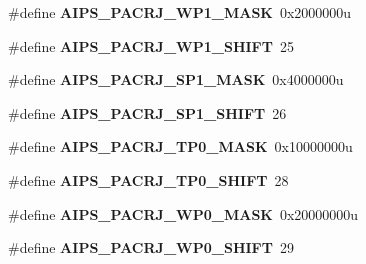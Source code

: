 \begin{DoxyCompactItemize}
\item 
\hypertarget{group___a_i_p_s___register___masks_ga1f954299ed96c89625f8767365dcdbdd}{}\#define {\bfseries A\+I\+P\+S\+\_\+\+P\+A\+C\+R\+J\+\_\+\+W\+P1\+\_\+\+M\+A\+S\+K}~0x2000000u\label{group___a_i_p_s___register___masks_ga1f954299ed96c89625f8767365dcdbdd}

\item 
\hypertarget{group___a_i_p_s___register___masks_gade30656b93fd7acb64b5168ccf471a2c}{}\#define {\bfseries A\+I\+P\+S\+\_\+\+P\+A\+C\+R\+J\+\_\+\+W\+P1\+\_\+\+S\+H\+I\+F\+T}~25\label{group___a_i_p_s___register___masks_gade30656b93fd7acb64b5168ccf471a2c}

\item 
\hypertarget{group___a_i_p_s___register___masks_gaf81780b0d6a382fd4c3451f2dd1c8671}{}\#define {\bfseries A\+I\+P\+S\+\_\+\+P\+A\+C\+R\+J\+\_\+\+S\+P1\+\_\+\+M\+A\+S\+K}~0x4000000u\label{group___a_i_p_s___register___masks_gaf81780b0d6a382fd4c3451f2dd1c8671}

\item 
\hypertarget{group___a_i_p_s___register___masks_ga528b1a6930491ad806bde225f2076dae}{}\#define {\bfseries A\+I\+P\+S\+\_\+\+P\+A\+C\+R\+J\+\_\+\+S\+P1\+\_\+\+S\+H\+I\+F\+T}~26\label{group___a_i_p_s___register___masks_ga528b1a6930491ad806bde225f2076dae}

\item 
\hypertarget{group___a_i_p_s___register___masks_gac789e0900f2bb960cddd5a2868558174}{}\#define {\bfseries A\+I\+P\+S\+\_\+\+P\+A\+C\+R\+J\+\_\+\+T\+P0\+\_\+\+M\+A\+S\+K}~0x10000000u\label{group___a_i_p_s___register___masks_gac789e0900f2bb960cddd5a2868558174}

\item 
\hypertarget{group___a_i_p_s___register___masks_ga4001b95beeda1f751216082bf3bbd981}{}\#define {\bfseries A\+I\+P\+S\+\_\+\+P\+A\+C\+R\+J\+\_\+\+T\+P0\+\_\+\+S\+H\+I\+F\+T}~28\label{group___a_i_p_s___register___masks_ga4001b95beeda1f751216082bf3bbd981}

\item 
\hypertarget{group___a_i_p_s___register___masks_ga17da301df0d9857525b7cf277100c03e}{}\#define {\bfseries A\+I\+P\+S\+\_\+\+P\+A\+C\+R\+J\+\_\+\+W\+P0\+\_\+\+M\+A\+S\+K}~0x20000000u\label{group___a_i_p_s___register___masks_ga17da301df0d9857525b7cf277100c03e}

\item 
\hypertarget{group___a_i_p_s___register___masks_ga8afcdeaeb9b8e821b6b4eb89caa02af4}{}\#define {\bfseries A\+I\+P\+S\+\_\+\+P\+A\+C\+R\+J\+\_\+\+W\+P0\+\_\+\+S\+H\+I\+F\+T}~29\label{group___a_i_p_s___register___masks_ga8afcdeaeb9b8e821b6b4eb89caa02af4}


\end{DoxyCompactItemize}
